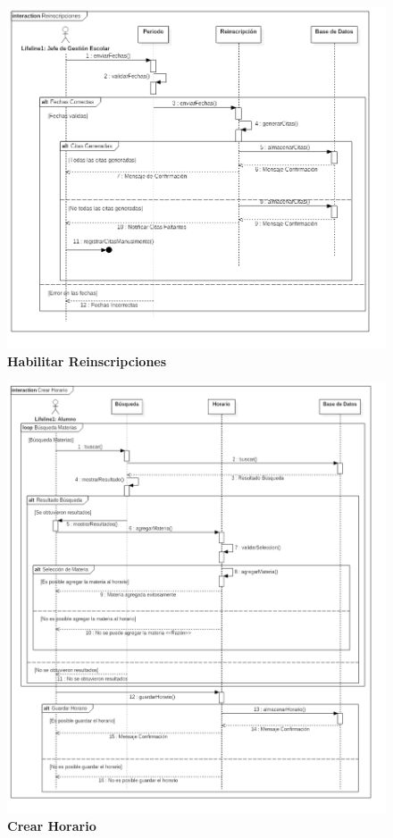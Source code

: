 \begin{figure}[H]
  \centering
    \includegraphics[scale=.6]{project/Secuencia/habilitar_reinscripcion.png}
  \caption{\textbf{Habilitar Reinscripciones}}
\end{figure}
\begin{figure}[H]
  \centering
    \includegraphics[scale=.51, angle=0]{project/Secuencia/crear_horario.png}
  \caption{\textbf{Crear Horario}}
\end{figure}
